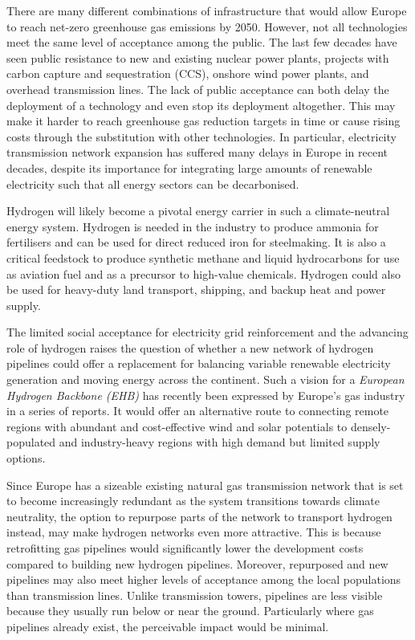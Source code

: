 There are many different combinations of infrastructure that would allow Europe
to reach net-zero greenhouse gas emissions by 2050. However, not all
technologies meet the same level of acceptance among the public. The last few
decades have seen public resistance to new and existing nuclear power plants,
projects with carbon capture and sequestration (CCS), onshore wind power plants,
and overhead transmission lines. The lack of public acceptance can both delay
the deployment of a technology and even stop its deployment altogether. This may
make it harder to reach greenhouse gas reduction targets in time or cause rising
costs through the substitution with other technologies. In particular,
electricity transmission network expansion has suffered many delays in Europe in
recent decades, despite its importance for integrating large amounts of
renewable electricity such that all energy sectors can be decarbonised.

Hydrogen will likely become a pivotal energy carrier in such a climate-neutral
energy system. Hydrogen is needed in the industry to produce ammonia for
fertilisers and can be used for direct reduced iron for steelmaking. It is also
a critical feedstock to produce synthetic methane and liquid hydrocarbons for
use as aviation fuel and as a precursor to high-value chemicals. Hydrogen could
also be used for heavy-duty land transport, shipping, and backup heat
and power supply.

The limited social acceptance for electricity grid reinforcement and the
advancing role of hydrogen raises the question of whether a new network of
hydrogen pipelines could offer a replacement for balancing variable renewable
electricity generation and moving energy across the continent. Such a vision for
a \textit{European Hydrogen Backbone (EHB)} has recently been expressed by
Europe's gas industry in a series of reports.
\cite{gasforclimateEuropeanHydrogen2020,gasforclimateEuropeanHydrogen2021,gasforclimateExtendingEuropean2021,gasforclimateEuropeanHydrogen2022}
It would offer an alternative route to connecting remote regions with abundant
and cost-effective wind and solar potentials to densely-populated and
industry-heavy regions with high demand but limited supply options.

Since Europe has a sizeable existing natural gas transmission network that is set to
become increasingly redundant as the system transitions towards climate
neutrality, the option to repurpose parts of the network to transport hydrogen
instead, may make hydrogen networks even more attractive. This is because
retrofitting gas pipelines would significantly lower the development costs
compared to building new hydrogen pipelines. Moreover, repurposed and new
pipelines may also meet higher levels of acceptance among the local populations
than transmission lines. Unlike transmission towers, pipelines are less visible
because they usually run below or near the ground. Particularly where gas
pipelines already exist, the perceivable impact would be minimal.

